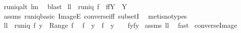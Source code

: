 \begin{isabellebody}
%
\isadelimproof
%
\endisadelimproof
%
\isatagproof
{}\isamarkupfalse%
\ runiq{\isacharunderscore}alt\ lm{}{}\ \isamarkupfalse%
\ blast%
\endisatagproof
{\isafoldproof}%
%
\isadelimproof
\isanewline
%
\endisadelimproof
\isanewline
{}\isamarkupfalse%
\ ll{}{}{\isacharcolon}\ \ {\isachardoublequoteopen}runiq\ f{\isachardoublequoteclose}\ \ {\isachardoublequoteopen}f{\isacharbackquote}{\isacharbackquote}{\isacharparenleft}f{\isacharcircum}{\isacharminus}{}{\isacharbackquote}{\isacharbackquote}Y{\isacharparenright}\ {\isasymsubseteq}\ Y{\isachardoublequoteclose}\ \isanewline
%
\isadelimproof
%
\endisadelimproof
%
\isatagproof
{}\isamarkupfalse%
\ assms\ runiq{\isacharunderscore}basic\ ImageE\ converse{\isacharunderscore}iff\ subsetI\ \isamarkupfalse%
\ {\isacharparenleft}metis{\isacharparenleft}no{\isacharunderscore}types{\isacharparenright}{\isacharparenright}%
\endisatagproof
{\isafoldproof}%
%
\isadelimproof
\isanewline
%
\endisadelimproof
\isanewline
{}\isamarkupfalse%
\ ll{}{}{\isacharcolon}\ \ {\isachardoublequoteopen}runiq\ f{\isachardoublequoteclose}\ {\isachardoublequoteopen}y{}\ {\isasymin}\ Range\ f{\isachardoublequoteclose}\ \ \isanewline
{\isachardoublequoteopen}{\isacharparenleft}f{\isacharcircum}{\isacharminus}{}\ {\isacharbackquote}{\isacharbackquote}\ {\isacharbraceleft}y{}{\isacharbraceright}\ {\isasyminter}\ f{\isacharcircum}{\isacharminus}{}\ {\isacharbackquote}{\isacharbackquote}\ {\isacharbraceleft}y{}{\isacharbraceright}\ {\isasymnoteq}\ {\isacharbraceleft}{\isacharbraceright}{\isacharparenright}\ {\isacharequal}\ {\isacharparenleft}f{\isacharcircum}{\isacharminus}{}{\isacharbackquote}{\isacharbackquote}{\isacharbraceleft}y{}{\isacharbraceright}{\isacharequal}f{\isacharcircum}{\isacharminus}{}{\isacharbackquote}{\isacharbackquote}{\isacharbraceleft}y{}{\isacharbraceright}{\isacharparenright}{\isachardoublequoteclose}\isanewline
%
\isadelimproof
%
\endisadelimproof
%
\isatagproof
{}\isamarkupfalse%
\ assms\ ll{}{}\ \isamarkupfalse%
\ fast%
\endisatagproof
{\isafoldproof}%
%
\isadelimproof
\isanewline
%
\endisadelimproof
\isanewline
\isanewline
{}\isamarkupfalse%
\ converse{\isacharunderscore}Image{\isacharcolon}\ \isanewline

\end{isabellebody}
